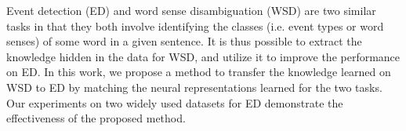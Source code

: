 Event detection (ED) and word sense disambiguation (WSD) are two similar tasks in that they both involve identifying the classes (i.e. event types or word senses) of some word in a given sentence. It is thus possible to extract the knowledge hidden in the data for WSD, and utilize it to improve the performance on ED. In this work, we propose a method to transfer the knowledge learned on WSD to ED by matching the neural representations learned for the two tasks. Our experiments on two widely used datasets for ED demonstrate the effectiveness of the proposed method.

